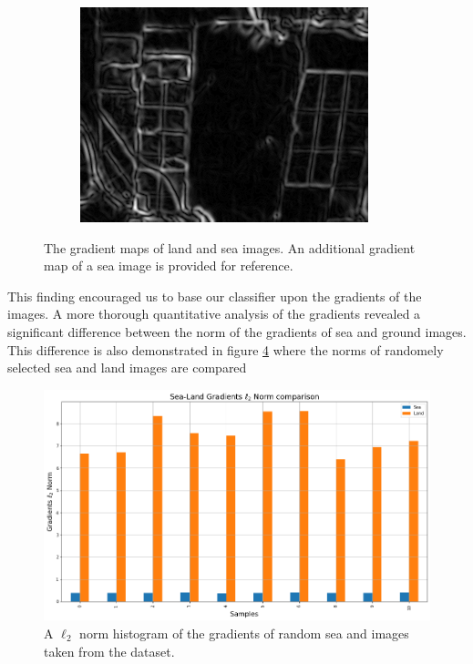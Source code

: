 \begin{figure}[H]
\begin{subfigure}[b]{0.32\textwidth}
        \label{fig:sea_grad}
    \end{subfigure}
    \hfill
    \begin{subfigure}[b]{0.32\textwidth}
        \centering
        \includegraphics[width=\textwidth]{../figs/data/land_grad.png}
        \label{fig:land_grad}
    \end{subfigure}
    \caption{The gradient maps of land and sea images. An additional gradient map of a sea image is provided for reference.}
    \label{fig:grad_img_comp}
\end{figure}
This finding encouraged us to base our classifier upon the gradients of the images.
A more thorough quantitative analysis of the gradients revealed a significant difference between the norm of the gradients of sea and ground images.
This difference is also demonstrated in figure \ref{fig:gradients_norm} where the norms of randomely selected sea and land images are compared
\begin{figure}[H]
    \centering
    \includegraphics[width=\linewidth]{../figs/data/grad_norm_comp.png}
    \caption{A $\ell_2$ norm histogram of the gradients of random sea and images taken from the dataset.}
    \label{fig:gradients_norm}
\end{figure}

